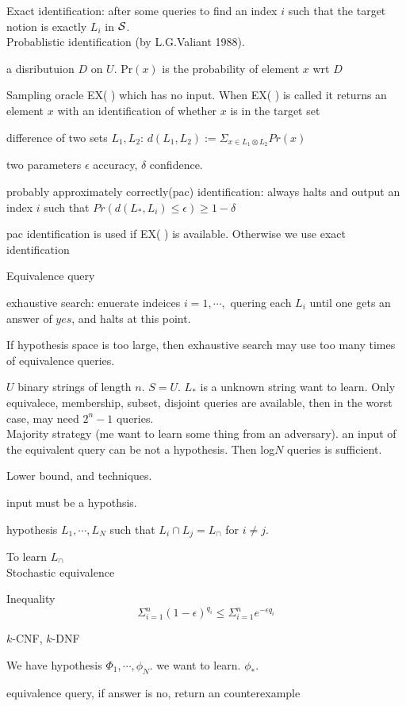 \documentclass[12pt]{article}
\begin{document}
Exact identification: after some queries to find an index $i$ such that the target notion is exactly $L_i$ in ${\cal S}$.\\


Probablistic identification (by L.G.Valiant 1988).

a disributuion $D$ on $U$. Pr$(x)$ is the probability of element $x$ wrt $D$

Sampling oracle EX( ) which has no input. When EX( ) is called it returns an element $x$ with an identification of whether $x$ is in the target set

difference of two sets $L_1, L_2$: $d(L_1, L_2):=\Sigma_{x\in L_1\otimes L_2} Pr(x)$


two parameters $\epsilon$ accuracy, $\delta$ confidence.

probably approximately correctly(pac) identification: always halts and output an index $i$ such that 
$Pr(d(L_*, L_i)\leq \epsilon)\geq 1-\delta$

pac identification is used if EX( ) is available. Otherwise we use exact identification




Equivalence query

exhaustive search: enuerate indeices $i=1,\cdots,$ quering each $L_i$ until one gets an answer of $yes$, and halts at this point.

If hypothesis space is too large, then exhaustive search may use too many times of equivalence queries. 


$U$ binary strings of length $n$. $S=U$. $L_*$ is a unknown string want to learn.
Only equivalece, membership, subset, disjoint queries are available, then in the worst case, may need $2^{n}-1$ queries.
\\

Majority strategy (me want to learn some thing from an adversary). an input of the equivalent query can be not a hypothesis. 
Then log$N$ queries is sufficient. 

Lower bound, and techniques.

input must be a hypothsis.



hypothesis $L_1, \cdots, L_N$ such that $L_i\cap L_j=L_{\cap}$ for $i\not=j$. 

To learn $L_{\cap}$ \\


Stochastic equivalence 

Inequality $$\Sigma_{i=1}^n (1-\epsilon)^{q_i}\leq\Sigma_{i=1}^ne^{-\epsilon q_i}$$



$k$-CNF, $k$-DNF

We have hypothesis $\Phi_1, \cdots, \phi_N$. we want to learn. $\phi_*$. 

equivalence query, if answer is no, return an counterexample 
\end{document}
